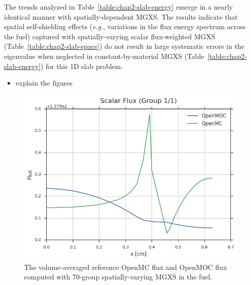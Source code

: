 The trends analyzed in Table~\ref{table:chap2-slab-energy} emerge in a nearly identical manner with spatially-dependent \ac{MGXS}. The results indicate that spatial self-shielding effects (\textit{e.g.}, variations in the flux energy spectrum across the fuel) captured with spatially-varying scalar flux-weighted \ac{MGXS} (Table~\ref{table:chap2-slab-space}) do not result in large systematic errors in the eigenvalue when neglected in constant-by-material \ac{MGXS} (Table~\ref{table:chap2-slab-energy}) for this 1D slab problem.

\begin{itemize}[noitemsep]
  \item explain the figures
\end{itemize}

\begin{figure}[h!]
  \centering
  \includegraphics[width=0.9\linewidth]{figures/biases/slab/flux-group-1-1}
  \caption{}
\label{fig:chap2-slab-flux}
\caption[Spatially-varying scalar flux a 1D slab.]{The volume-averaged reference OpenMC flux and OpenMOC flux computed with 70-group spatially-varying \ac{MGXS} in the fuel.}
\end{figure}

